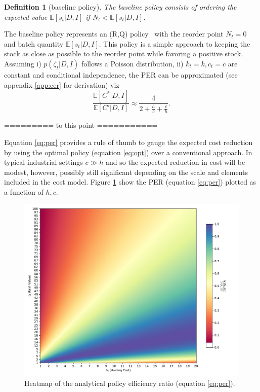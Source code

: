 \documentclass[a4paper,12pt]{article}
\newtheorem{definition}{Definition}
\begin{document}
	\begin{definition}[baseline policy]
		The baseline policy consists of ordering the expected value $\mathbb{E}[s_t|D,I]$ if $N_t<\mathbb{E}[s_t|D,I]$.
	\end{definition}
	
	The baseline policy represents an (R,Q) policy~\citep{bartmann1992inventory,axsaeter2006inventory} with the reorder point $N_t=0$ and batch quantity $\mathbb{E}[s_t|D,I]$. This policy is a simple approach to keeping the stock as close as possible to the reorder point while favoring a positive stock. Assuming i) $p(\zeta_t|D,I)$ follows a Poisson distribution, ii) $k_t=k,c_t=c$ are constant and conditional independence, the PER can be approximated (see appendix \ref{app:cer} for derivation) viz
	\begin{equation}
		\frac{\mathbb{E}[C^*|D,I] }{\mathbb{E}[C'|D,I]}\approx \frac{4}{2+\frac{h}{c}+\frac{c}{h}}.
		\label{eq:per}
	\end{equation}
	
	
	========= to this point ===========
	
	Equation \eqref{eq:per} provides a rule of thumb to gauge the expected cost reduction by using the optimal policy (equation \eqref{eq:opt}) over a conventional approach. In typical industrial settings $c\gg h$ and so the expected reduction in cost will be modest, however, possibly still significant depending on the scale and elements included in the cost model. Figure \ref{fig:heatmap_analytical} show the PER (equation \eqref{eq:per}) plotted as a function of $h,c$.
	\begin{figure}[h!]
		\centering
		\includegraphics[width=\textwidth]{figures/analytical_per.pdf}
		\caption{Heatmap of the analytical policy efficiency ratio (equation \eqref{eq:per}).}
		\label{fig:heatmap_analytical}
	\end{figure}
	
\end{document}
